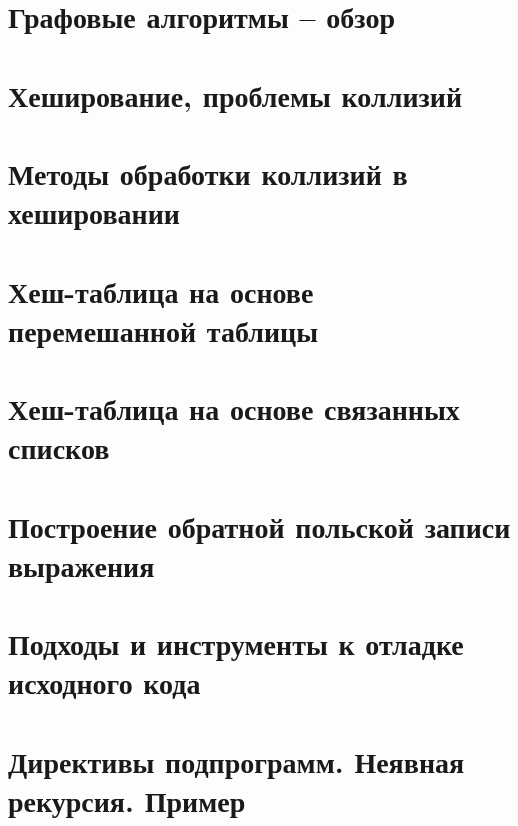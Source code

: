 \section{Графовые алгоритмы – обзор}
\section{Хеширование, проблемы коллизий}
\section{Методы обработки коллизий в хешировании}
\section{Хеш-таблица на основе перемешанной таблицы}
\section{Хеш-таблица на основе связанных списков}
\section{Построение обратной польской записи выражения}
\section{Подходы и инструменты к отладке исходного кода}
\section{Директивы подпрограмм. Неявная рекурсия. Пример}
